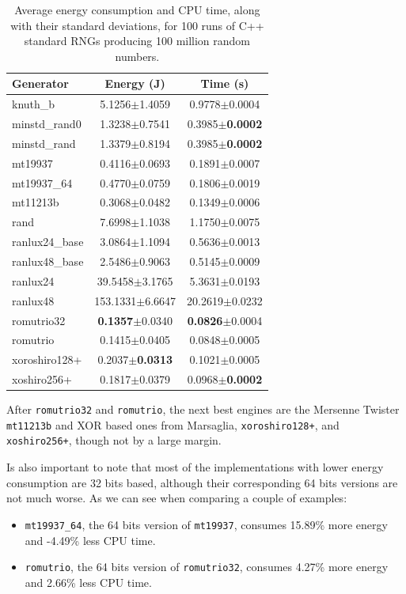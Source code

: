 \documentclass[dvipsnames,format=sigconf]{acmart}
\begin{document}
\begin{table}
\centering
\caption{Average energy consumption and CPU time, along with their standard deviations, for 100 runs of C++ standard RNGs producing 100 million random numbers.}
\begin{tabular}{lcc}
\toprule
Generator & Energy (J) & Time (s) \\
\midrule
knuth\_b & 5.1256$\pm$1.4059 & 0.9778$\pm$0.0004 \\
minstd\_rand0 & 1.3238$\pm$0.7541 & 0.3985$\pm$\textbf{0.0002} \\
minstd\_rand & 1.3379$\pm$0.8194 & 0.3985$\pm$\textbf{0.0002} \\
mt19937 & 0.4116$\pm$0.0693 & 0.1891$\pm$0.0007 \\
mt19937\_64 & 0.4770$\pm$0.0759 & 0.1806$\pm$0.0019 \\
mt11213b & 0.3068$\pm$0.0482 & 0.1349$\pm$0.0006 \\
rand & 7.6998$\pm$1.1038 & 1.1750$\pm$0.0075 \\
ranlux24\_base & 3.0864$\pm$1.1094 & 0.5636$\pm$0.0013 \\
ranlux48\_base & 2.5486$\pm$0.9063 & 0.5145$\pm$0.0009 \\
ranlux24 & 39.5458$\pm$3.1765 & 5.3631$\pm$0.0193 \\
ranlux48 & 153.1331$\pm$6.6647 & 20.2619$\pm$0.0232 \\
romutrio32 & \textbf{0.1357}$\pm$0.0340 & \textbf{0.0826}$\pm$0.0004 \\
romutrio & 0.1415$\pm$0.0405 & 0.0848$\pm$0.0005 \\
xoroshiro128+ & 0.2037$\pm$\textbf{0.0313} & 0.1021$\pm$0.0005 \\
xoshiro256+ & 0.1817$\pm$0.0379 & 0.0968$\pm$\textbf{0.0002} \\
\bottomrule
\end{tabular}
\label{tab:pkg}
\end{table}

After \texttt{romutrio32} and \texttt{romutrio}, the next best engines are the Mersenne Twister \texttt{mt11213b} and XOR based ones from Marsaglia, \texttt{xoroshiro128+}, and \texttt{xoshiro256+}, though not by a large margin.

Is also important to note that most of the implementations with lower energy consumption are 32 bits based, although their corresponding 64 bits versions are not much worse. As we can see when comparing a couple of examples:
\begin{itemize}
\item \texttt{mt19937\_64}, the 64 bits version of \texttt{mt19937}, consumes 15.89\% more energy and -4.49\% less CPU time.
\item \texttt{romutrio}, the 64 bits version of \texttt{romutrio32}, consumes 4.27\% more energy and 2.66\% less CPU time.
\end{itemize}
\end{document}
